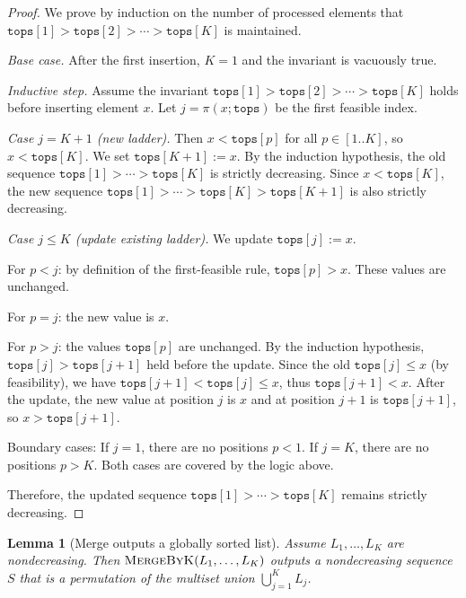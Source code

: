 \documentclass{ieeeaccess}
\theoremstyle{plain}
\newtheorem{lemma}[theorem]{Lemma}
\theoremstyle{definition}
\newcommand{\tops}{\texttt{tops}}
\begin{document}
\begin{proof}
We prove by induction on the number of processed elements that
$\tops[1] > \tops[2] > \cdots > \tops[K]$ is maintained.

\emph{Base case.} After the first insertion, $K=1$ and the invariant is vacuously true.

\emph{Inductive step.} Assume the invariant $\tops[1] > \tops[2] > \cdots > \tops[K]$ holds
before inserting element $x$. Let $j = \pi(x; \tops)$ be the first feasible index.

\textit{Case $j = K+1$ (new ladder).}
Then $x < \tops[p]$ for all $p \in [1..K]$, so $x < \tops[K]$.
We set $\tops[K+1] := x$. By the induction hypothesis, the old sequence
$\tops[1] > \cdots > \tops[K]$ is strictly decreasing. Since $x < \tops[K]$,
the new sequence $\tops[1] > \cdots > \tops[K] > \tops[K+1]$ is also strictly decreasing.

\textit{Case $j \le K$ (update existing ladder).}
We update $\tops[j] := x$.

For $p < j$: by definition of the first-feasible rule, $\tops[p] > x$. These values are unchanged.

For $p = j$: the new value is $x$.

For $p > j$: the values $\tops[p]$ are unchanged. By the induction hypothesis,
$\tops[j] > \tops[j+1]$ held before the update. Since the old $\tops[j] \le x$
(by feasibility), we have $\tops[j+1] < \tops[j] \le x$, thus $\tops[j+1] < x$.
After the update, the new value at position $j$ is $x$ and at position $j+1$ is $\tops[j+1]$,
so $x > \tops[j+1]$.

Boundary cases: If $j=1$, there are no positions $p<1$. If $j=K$, there are no positions $p>K$.
Both cases are covered by the logic above.

Therefore, the updated sequence $\tops[1] > \cdots > \tops[K]$ remains strictly decreasing.
\end{proof}

\begin{lemma}[Merge outputs a globally sorted list]
\label{lem:merge_sorted}
Assume $L_1, \dots, L_K$ are nondecreasing.  Then
$\textsc{MergeByK}(L_1, \dots, L_K)$ outputs a nondecreasing sequence $S$
that is a permutation of the multiset union $\bigcup_{j=1}^K L_j$.
\end{lemma}
\end{document}
